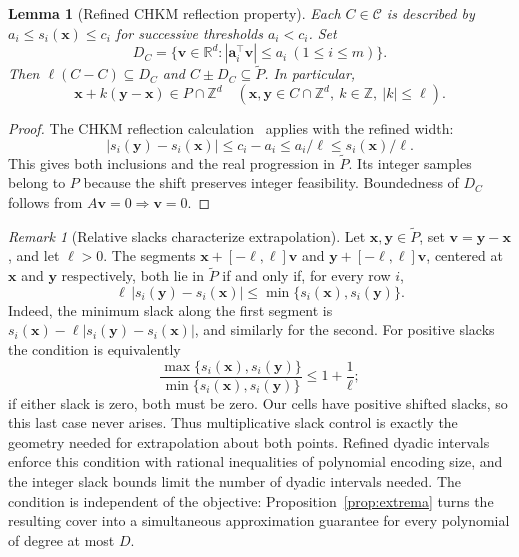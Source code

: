 \documentclass[final,5p,times,twocolumn]{elsarticle}
\newtheorem{lemma}[theorem]{Lemma}
\theoremstyle{definition}\newtheorem{definition}{Definition}[section]
\theoremstyle{remark}\newtheorem{remark}[theorem]{Remark}
\newcommand{\R}{\mathbb R}\newcommand{\Q}{\mathbb Q}\newcommand{\Z}{\mathbb Z}
\begin{document}
\begin{lemma}[Refined CHKM reflection property]\label{lem:reflection}
Each $C\in\mathcal C$ is described by $a_i\le s_i(\mathbf{x})\le c_i$ for successive thresholds $a_i<c_i$. Set
\[
 D_C=\{\mathbf v\in\R^d:|\mathbf a_i^\top\mathbf v|\le a_i\ (1\le i\le m)\}.
\]
Then $\ell(C-C)\subseteq D_C$ and $C\pm D_C\subseteq\widetilde P$. In particular,
\begin{equation}\label{eq:long}
 \mathbf{x}+k(\mathbf{y}-\mathbf{x})\in P\cap\Z^d
 \quad(\mathbf{x},\mathbf y\in C\cap\Z^d,\ k\in\Z,\ |k|\le\ell).
\end{equation}
\end{lemma}
\begin{proof}
The CHKM reflection calculation~\cite[p.~30]{CHKM} applies with the refined width:
\[
 |s_i(\mathbf y)-s_i(\mathbf{x})|\le c_i-a_i\le a_i/\ell
 \le s_i(\mathbf{x})/\ell.
\]
This gives both inclusions and the real progression in $\widetilde P$. Its integer samples belong to $P$ because the shift preserves integer feasibility. Boundedness of $D_C$ follows from $A\mathbf v=0\Rightarrow\mathbf v=0$.
\end{proof}

\begin{remark}[Relative slacks characterize extrapolation]\label{rem:slack-characterization}
Let $\mathbf{x},\mathbf y\in\widetilde P$, set $\mathbf v=\mathbf y-\mathbf{x}$, and let $\ell>0$. The segments $\mathbf{x}+[-\ell,\ell]\mathbf v$ and $\mathbf y+[-\ell,\ell]\mathbf v$, centered at $\mathbf{x}$ and $\mathbf y$ respectively, both lie in $\widetilde P$ if and only if, for every row $i$,
\[
 \ell\,|s_i(\mathbf y)-s_i(\mathbf{x})|
 \le\min\{s_i(\mathbf{x}),s_i(\mathbf y)\}.
\]
Indeed, the minimum slack along the first segment is $s_i(\mathbf{x})-\ell|s_i(\mathbf y)-s_i(\mathbf{x})|$, and similarly for the second. For positive slacks the condition is equivalently
\[
 \frac{\max\{s_i(\mathbf{x}),s_i(\mathbf y)\}}
 {\min\{s_i(\mathbf{x}),s_i(\mathbf y)\}}\le1+\frac1\ell;
\]
if either slack is zero, both must be zero. Our cells have positive shifted slacks, so this last case never arises. Thus multiplicative slack control is exactly the geometry needed for extrapolation about both points. Refined dyadic intervals enforce this condition with rational inequalities of polynomial encoding size, and the integer slack bounds limit the number of dyadic intervals needed. The condition is independent of the objective: Proposition~\ref{prop:extrema} turns the resulting cover into a simultaneous approximation guarantee for every polynomial of degree at most $D$.
\end{remark}
\end{document}
